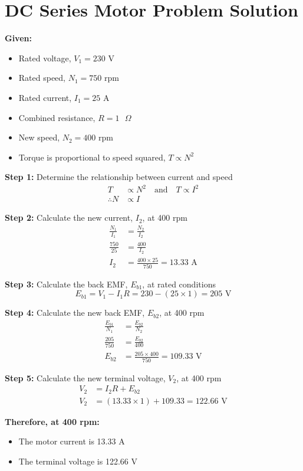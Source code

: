 \documentclass[12pt]{article}
\begin{document}
	
	\section*{DC Series Motor Problem Solution}
	
	\textbf{Given:}
	\begin{itemize}
		\item Rated voltage, $V_1 = 230 \text{ V}$
		\item Rated speed, $N_1 = 750 \text{ rpm}$
		\item Rated current, $I_1 = 25 \text{ A}$
		\item Combined resistance, $R = 1 \text{ }\Omega$
		\item New speed, $N_2 = 400 \text{ rpm}$
		\item Torque is proportional to speed squared, $T \propto N^2$
	\end{itemize}
	
	\textbf{Step 1:} Determine the relationship between current and speed
	\begin{align*}
		T &\propto N^2 \quad \text{and} \quad T \propto I^2 \\
		\therefore N &\propto I
	\end{align*}
	
	\textbf{Step 2:} Calculate the new current, $I_2$, at 400 rpm
	\begin{align*}
		\frac{N_1}{I_1} &= \frac{N_2}{I_2} \\
		\frac{750}{25} &= \frac{400}{I_2} \\
		I_2 &= \frac{400 \times 25}{750} = 13.33 \text{ A}
	\end{align*}
	
	\textbf{Step 3:} Calculate the back EMF, $E_{b1}$, at rated conditions
	\begin{equation*}
		E_{b1} = V_1 - I_1 R = 230 - (25 \times 1) = 205 \text{ V}
	\end{equation*}
	
	\textbf{Step 4:} Calculate the new back EMF, $E_{b2}$, at 400 rpm
	\begin{align*}
		\frac{E_{b1}}{N_1} &= \frac{E_{b2}}{N_2} \\
		\frac{205}{750} &= \frac{E_{b2}}{400} \\
		E_{b2} &= \frac{205 \times 400}{750} = 109.33 \text{ V}
	\end{align*}
	
	\textbf{Step 5:} Calculate the new terminal voltage, $V_2$, at 400 rpm
	\begin{align*}
		V_2 &= I_2 R + E_{b2} \\
		V_2 &= (13.33 \times 1) + 109.33 = 122.66 \text{ V}
	\end{align*}
	
	\textbf{Therefore, at 400 rpm:}
	\begin{itemize}
		\item The motor current is 13.33 A
		\item The terminal voltage is 122.66 V
	\end{itemize}
	
\end{document}
